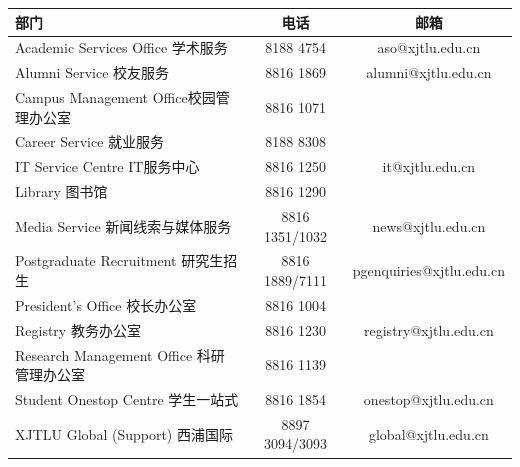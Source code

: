 \begin{table}[H]
    \begin{tabular}{p{60mm}cc}
        \hline
        部门 & 电话 & 邮箱 \\ \hline
        Academic Services Office \newline 学术服务 & 8188 4754 & aso@xjtlu.edu.cn \\ \hline
        Alumni Service \newline 校友服务           & 8816 1869 & alumni@xjtlu.edu.cn \\ \hline
        Campus Management Office\newline 校园管理办公室 & 8816 1071 &  \\ \hline
        Career Service \newline 就业服务           & 8188 8308 &  \\ \hline
        IT Service Centre \newline IT服务中心      & 8816 1250 & it@xjtlu.edu.cn \\ \hline
        Library \newline 图书馆                    & 8816 1290 &  \\ \hline
        Media Service \newline 新闻线索与媒体服务    & 8816 1351/1032 & news@xjtlu.edu.cn \\ \hline
        Postgraduate Recruitment \newline 研究生招生 & 8816 1889/7111 & pgenquiries@xjtlu.edu.cn \\ \hline
        President's Office \newline 校长办公室     & 8816 1004 &  \\ \hline
        Registry \newline 教务办公室               & 8816 1230 & registry@xjtlu.edu.cn \\ \hline
        Research Management Office \newline 科研管理办公室 & 8816 1139 &  \\ \hline
        Student Onestop Centre \newline 学生一站式 & 8816 1854 & onestop@xjtlu.edu.cn \\ \hline
        XJTLU Global (Support) \newline 西浦国际 & 8897 3094/3093 & global@xjtlu.edu.cn \\ \hline
    \end{tabular}
\end{table}